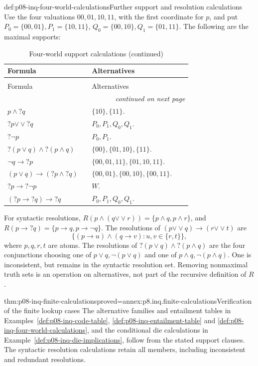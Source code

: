 \begin{hbexample}{def:p08-inq-four-world-calculations}{Further support and resolution calculations}
Use the four valuations \(00,01,10,11\), with the first coordinate for
\(p\), and put \(P_0=\{00,01\},P_1=\{10,11\}\),
\(Q_0=\{00,10\},Q_1=\{01,11\}\). The following are the maximal supports:
\begin{longtable}{@{}p{0.42\linewidth}p{0.50\linewidth}@{}}
\caption{Four-world support calculations}\label{tab:p08-inq-four-world}\\
\hline Formula & Alternatives \\\hline\endfirsthead
\caption[]{Four-world support calculations (continued)}\\
\hline Formula & Alternatives \\\hline\endhead
\hline\multicolumn{2}{r}{\emph{continued on next page}}\\
\endfoot
\endlastfoot
\(p\land?q\) & \(\{10\},\{11\}\). \\
\(?p\mathbin{\vee\!\vee}?q\) & \(P_0,P_1,Q_0,Q_1\). \\
\(?\neg p\) & \(P_0,P_1\). \\
\(?(p\lor q)\land?(p\land q)\) & \(\{00\},\{01,10\},\{11\}\). \\
\(\neg q\to?p\) & \(\{00,01,11\},\{01,10,11\}\). \\
\((p\lor q)\to(?p\land?q)\) & \(\{00,01\},\{00,10\},\{00,11\}\). \\
\(?p\to?\neg p\) & \(W\). \\
\((?p\to?q)\to?q\) & \(P_0,P_1,Q_0,Q_1\). \\
\hline
\end{longtable}
For syntactic resolutions, \(R(p\land(q\mathbin{\vee\!\vee}r))
=\{p\land q,p\land r\}\), and
\(R(p\to?q)=\{p\to q,p\to\neg q\}\).
The resolutions of \((p\mathbin{\vee\!\vee}q)\to
(r\mathbin{\vee\!\vee}t)\) are
\[
 \{(p\to u)\land(q\to v):u,v\in\{r,t\}\},
\]
where \(p,q,r,t\) are atoms. The resolutions of
\(?(p\lor q)\land?(p\land q)\) are the four conjunctions choosing
one of \(p\lor q,\neg(p\lor q)\) and one of
\(p\land q,\neg(p\land q)\). One is inconsistent, but remains in
the syntactic resolution set. Removing nonmaximal truth sets is an
operation on alternatives, not part of the recursive definition of \(R\).
\end{hbexample}

\begin{hblemma}{thm:p08-inq-finite-calculations}{proved=annex:p8.inq.finite-calculations}{Verification of the finite lookup cases}
The alternative families and entailment tables in
Examples~\ref{def:p08-inq-code-table}, \ref{def:p08-inq-entailment-table}
and \ref{def:p08-inq-four-world-calculations}, and the conditional die
calculations in Example~\ref{def:p08-inq-die-implications}, follow from
the stated support clauses. The syntactic resolution calculations retain
all members, including inconsistent and redundant resolutions.
\end{hblemma}

